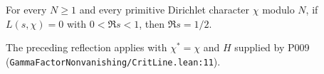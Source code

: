 
\begin{formalstatement}\label{pn:P007}
For every $N\ge1$ and every primitive Dirichlet character $\chi$ modulo $N$, if $L(s,\chi)=0$ with $0<\Re s<1$, then $\Re s=1/2$.
\end{formalstatement}
The preceding reflection applies with $\chi^*=\chi$ and $H$ supplied by P009 (\nolinkurl{GammaFactorNonvanishing/CritLine.lean:11}).
